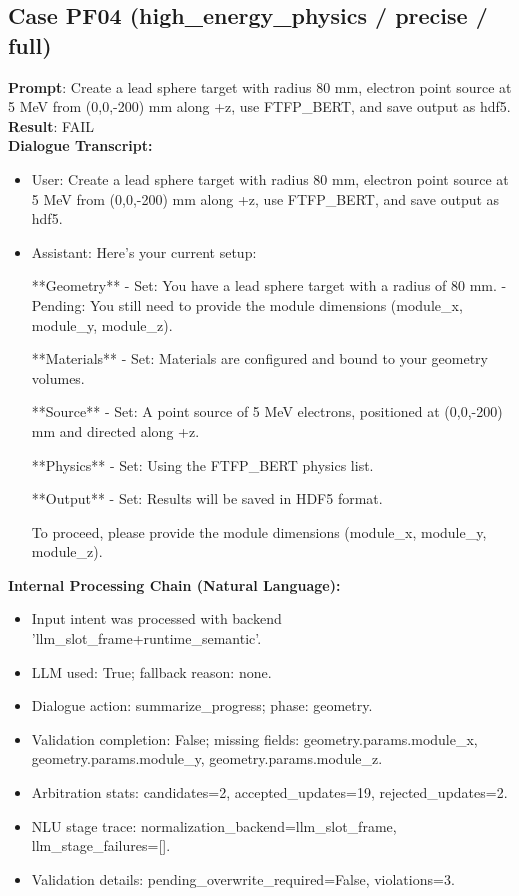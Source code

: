 \documentclass[11pt]{ctexart}
\begin{document}
\subsection{Case PF04 (high\_energy\_physics / precise / full)}
\textbf{Prompt}: Create a lead sphere target with radius 80 mm, electron point source at 5 MeV from (0,0,-200) mm along +z, use FTFP\_BERT, and save output as hdf5.\\
\textbf{Result}: FAIL\\
\textbf{Dialogue Transcript:}
\begin{itemize}
\item User: Create a lead sphere target with radius 80 mm, electron point source at 5 MeV from (0,0,-200) mm along +z, use FTFP\_BERT, and save output as hdf5.
\item Assistant: Here's your current setup:

**Geometry**
- Set: You have a lead sphere target with a radius of 80 mm.
- Pending: You still need to provide the module dimensions (module\_x, module\_y, module\_z).

**Materials**
- Set: Materials are configured and bound to your geometry volumes.

**Source**
- Set: A point source of 5 MeV electrons, positioned at (0,0,-200) mm and directed along +z.

**Physics**
- Set: Using the FTFP\_BERT physics list.

**Output**
- Set: Results will be saved in HDF5 format.

To proceed, please provide the module dimensions (module\_x, module\_y, module\_z).
\end{itemize}
\textbf{Internal Processing Chain (Natural Language):}
\begin{itemize}
\item Input intent was processed with backend 'llm\_slot\_frame+runtime\_semantic'.
\item LLM used: True; fallback reason: none.
\item Dialogue action: summarize\_progress; phase: geometry.
\item Validation completion: False; missing fields: geometry.params.module\_x, geometry.params.module\_y, geometry.params.module\_z.
\item Arbitration stats: candidates=2, accepted\_updates=19, rejected\_updates=2.
\item NLU stage trace: normalization\_backend=llm\_slot\_frame, llm\_stage\_failures=[].
\item Validation details: pending\_overwrite\_required=False, violations=3.
\end{itemize}
\end{document}
